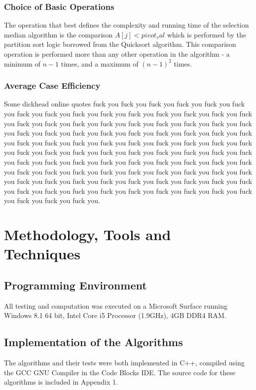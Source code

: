\documentclass{article}
\begin{document}
        \subsubsection{Choice of Basic Operations}
            The operation that best defines the complexity and running time of the selection median algorithm is the comparison $A[j] < pivot_val$ which is performed by the partition sort logic borrowed from the Quicksort algorithm. This comparison operation is performed more than any other operation in the algorithm - a minimum of $n - 1$ times, and a maximum of $(n - 1)^2$ times.
        \subsubsection{Average Case Efficiency}
            Some dickhead online quotes fuck you fuck you fuck you fuck you fuck you fuck you fuck you fuck you fuck you fuck you fuck you fuck you fuck you fuck you fuck you fuck you fuck you fuck you fuck you fuck you fuck you fuck you fuck you fuck you fuck you fuck you fuck you fuck you fuck you fuck you fuck you fuck you fuck you fuck you fuck you fuck you fuck you fuck you fuck you fuck you fuck you fuck you fuck you fuck you fuck you fuck you fuck you fuck you fuck you fuck you fuck you fuck you fuck you fuck you fuck you fuck you fuck you fuck you fuck you fuck you fuck you fuck you fuck you fuck you fuck you fuck you fuck you fuck you fuck you fuck you fuck you fuck you fuck you fuck you fuck you fuck you fuck you fuck you fuck you fuck you fuck you fuck you fuck you fuck you fuck you fuck you fuck you fuck you fuck you fuck you.

\section{Methodology, Tools and Techniques}
    \subsection{Programming Environment}
        All testing and computation was executed on a Microsoft Surface running Windows 8.1 64 bit, Intel Core i5 Processor (1.9GHz), 4GB DDR4 RAM.
        \subsection{Implementation of the Algorithms}
        The algorithms and their tests were both implemented in C++, compiled using the GCC GNU Compiler in the Code Blocks IDE. The source code for these algorithms is included in Appendix 1.
\end{document}
